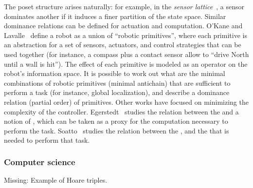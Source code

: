 
\begin{figure}
	\centering
	\caption{}
	\label{fig:robot-generic}
\end{figure}


The poset structure arises naturally: for example, in the \emph{sensor lattice}~\cite{lavalle12sensing}, a sensor dominates another if it induces a finer partition of the state space.
Similar dominance relations can be defined for actuation and computation.
O'Kane and Lavalle~\cite{okane08comparing} define a robot as a union of ``robotic primitives'', where each primitive is an abstraction for a set of sensors, actuators, and control strategies that can be used together
(for instance, a compass plus a contact sensor allow to ``drive North until a wall is hit'').
The effect of each primitive is modeled as an operator on the robot's information space.
It is possible to work out what are the minimal combinations of robotic primitives (minimal antichain) that are sufficient to perform a task (for instance, global localization), and describe a dominance relation (partial order) of primitives.
Other works have focused on minimizing the complexity of the controller.
Egerstedt~\cite{egerstedt03motion} studies the relation between the  and a notion of , which can be taken as a proxy for the computation necessary to perform the task.
Soatto~\cite{soatto11steps} studies the relation between the , and the  that is needed to perform that task.

\subsubsection{Computer science}

\begin{publictodo}
	Missing: Example of Hoare triples.
\end{publictodo}

